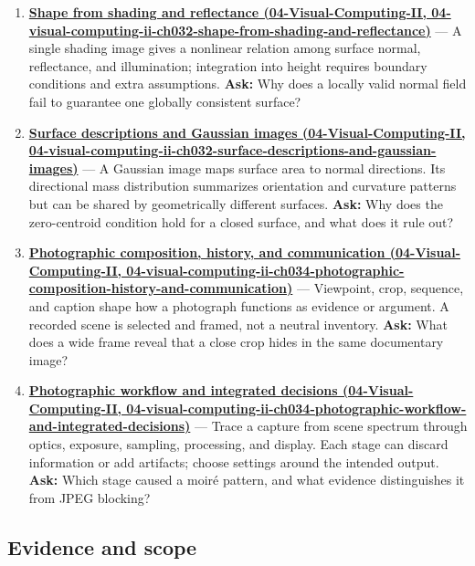 \begin{enumerate}
\item
  \textbf{\href{../04-Visual-Computing-II/main.pdf\#nameddest=04-visual-computing-ii-ch032-shape-from-shading-and-reflectance}{Shape from shading and reflectance (04-Visual-Computing-II, 04-visual-computing-ii-ch032-shape-from-shading-and-reflectance)}} --- A single shading image gives a nonlinear relation among surface normal, reflectance, and illumination; integration into height requires boundary conditions and extra assumptions. \textbf{Ask:} Why does a locally valid normal field fail to guarantee one globally consistent surface?
\item
  \textbf{\href{../04-Visual-Computing-II/main.pdf\#nameddest=04-visual-computing-ii-ch032-surface-descriptions-and-gaussian-images}{Surface descriptions and Gaussian images (04-Visual-Computing-II, 04-visual-computing-ii-ch032-surface-descriptions-and-gaussian-images)}} --- A Gaussian image maps surface area to normal directions. Its directional mass distribution summarizes orientation and curvature patterns but can be shared by geometrically different surfaces. \textbf{Ask:} Why does the zero-centroid condition hold for a closed surface, and what does it rule out?
\item
  \textbf{\href{../04-Visual-Computing-II/main.pdf\#nameddest=04-visual-computing-ii-ch034-photographic-composition-history-and-communication}{Photographic composition, history, and communication (04-Visual-Computing-II, 04-visual-computing-ii-ch034-photographic-composition-history-and-communication)}} --- Viewpoint, crop, sequence, and caption shape how a photograph functions as evidence or argument. A recorded scene is selected and framed, not a neutral inventory. \textbf{Ask:} What does a wide frame reveal that a close crop hides in the same documentary image?
\item
  \textbf{\href{../04-Visual-Computing-II/main.pdf\#nameddest=04-visual-computing-ii-ch034-photographic-workflow-and-integrated-decisions}{Photographic workflow and integrated decisions (04-Visual-Computing-II, 04-visual-computing-ii-ch034-photographic-workflow-and-integrated-decisions)}} --- Trace a capture from scene spectrum through optics, exposure, sampling, processing, and display. Each stage can discard information or add artifacts; choose settings around the intended output. \textbf{Ask:} Which stage caused a moiré pattern, and what evidence distinguishes it from JPEG blocking?
\end{enumerate}

\subsection{Evidence and scope}\label{appendix-a8f634b076b5-evidence-and-scope}

